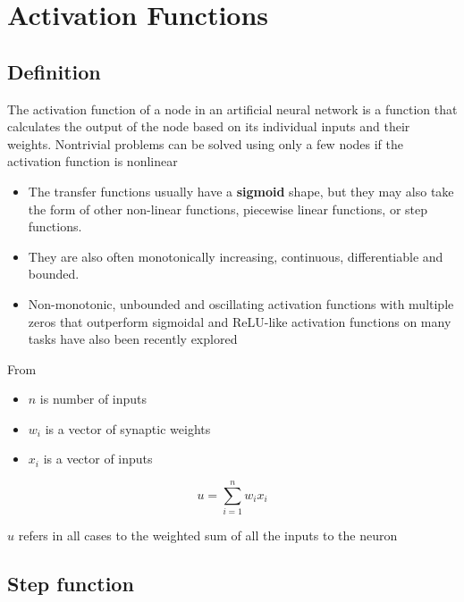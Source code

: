 \chapter{Activation Functions}\label{chapter: Activation Functions}

\section{Definition \cite{wiki-Artificial_neuron, wiki-activation-fn}}

The activation function of a node in an artificial neural network is a function that calculates the output of the node based on its individual inputs and their weights. Nontrivial problems can be solved using only a few nodes if the activation function is nonlinear

\vspace{0.2cm}
\begin{itemize}
    \item  The transfer functions usually have a \textbf{sigmoid} shape, but they may also take the form of other non-linear functions, piecewise linear functions, or step functions.
    \item They are also often monotonically increasing, continuous, differentiable and bounded. 
    \item  Non-monotonic, unbounded and oscillating activation functions with multiple zeros that outperform sigmoidal and ReLU-like activation functions on many tasks have also been recently explored
\end{itemize}

\vspace{0.2cm}
\noindent From \cite{wiki-Artificial_neuron} \\

\begin{itemize}
    \item $n$ is number of inputs
    \item $w_i$ is a vector of synaptic weights
    \item $x_i$ is a vector of inputs
\end{itemize}
\[
    u=\sum _{i=1}^{n}w_{i}x_{i}
\]

$u$ refers in all cases to the weighted sum of all the inputs to the neuron

\section{Step function \cite{wiki-Artificial_neuron}}\label{Step function}

